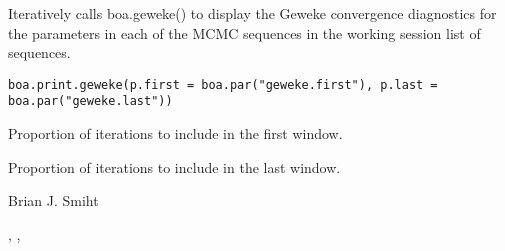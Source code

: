 \begin{Description}\relax
Iteratively calls boa.geweke() to display the Geweke convergence diagnostics 
for the parameters in each of the MCMC sequences in the working session list 
of sequences.
\end{Description}
\begin{Usage}
\begin{verbatim}
boa.print.geweke(p.first = boa.par("geweke.first"), p.last = boa.par("geweke.last"))
\end{verbatim}
\end{Usage}
\begin{Arguments}
\begin{ldescription}
\item[\code{p.first}] Proportion of iterations to include in the first window.
\item[\code{p.last}] Proportion of iterations to include in the last window.
\end{ldescription}
\end{Arguments}
\begin{Author}\relax
Brian J. Smiht
\end{Author}
\begin{SeeAlso}\relax
{}, ,
\end{SeeAlso}

